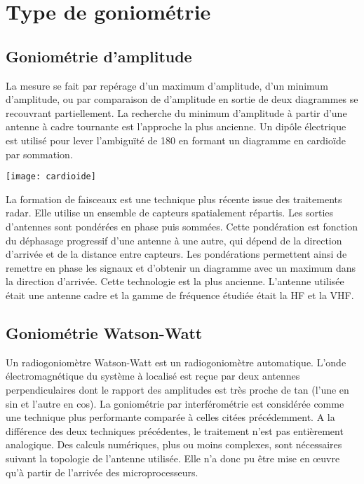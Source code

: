 \section{Type de goniométrie}

\subsection{Goniométrie d'amplitude}

	La mesure se fait par repérage d’un maximum d’amplitude, d’un minimum d’amplitude, ou par comparaison de d’amplitude en sortie de deux diagrammes se recouvrant partiellement. La recherche du minimum d’amplitude à partir d’une antenne à cadre tournante est l’approche la plus ancienne. Un dipôle électrique est utilisé pour lever l’ambiguïté de 180 en formant un diagramme en cardioïde par sommation.
	
\texttt{[image: cardioide]}
\parindent=15pt

	La formation de faisceaux est une technique plus récente issue des traitements radar. Elle utilise un ensemble de capteurs spatialement répartis. Les sorties d’antennes sont pondérées en phase puis sommées. Cette pondération est fonction du déphasage progressif d’une antenne à une autre, qui dépend de la direction d’arrivée et de la distance entre capteurs. Les pondérations permettent ainsi de remettre en phase les signaux et d’obtenir un diagramme avec un maximum dans la direction d’arrivée.
 Cette technologie est la plus ancienne. L’antenne utilisée était une antenne cadre et la gamme de fréquence étudiée était la HF et la VHF.

\subsection{Goniométrie Watson-Watt}
\label{Watson-Watt}

	Un radiogoniomètre Watson-Watt est un radiogoniomètre automatique. L’onde électromagnétique du système à localisé est reçue par deux antennes perpendiculaires dont le rapport des amplitudes est très proche de tan (l’une en sin et l’autre en cos). La goniométrie par interférométrie est considérée comme une technique plus performante comparée à celles citées précédemment. A la différence des deux techniques précédentes, le traitement n’est pas entièrement analogique. Des calculs numériques, plus ou moins complexes, sont nécessaires suivant la topologie de l’antenne utilisée. Elle n’a donc pu être mise en œuvre qu’à partir de l’arrivée des microprocesseurs.

